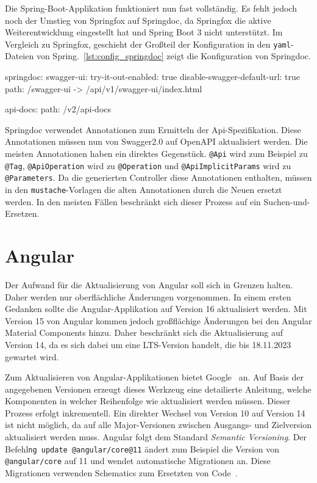 Die Spring-Boot-Applikation funktioniert nun fast vollständig. Es fehlt jedoch noch der Umstieg von Springfox auf Springdoc, da Springfox die aktive Weiterentwicklung eingestellt hat und Spring Boot 3 nicht unterstützt. Im Vergleich zu Springfox, geschieht der Großteil der Konfiguration in den \texttt{yaml}-Dateien von Spring.~\autoref{lst:config_springdoc} zeigt die Konfiguration von Springdoc.

\begin{JavaCode}[numbers=none, caption={Konfiguration von Springdoc}, label={lst:config_springdoc}]
  springdoc:
    swagger-ui:
      try-it-out-enabled: true
      disable-swagger-default-url: true
      path: /swagger-ui -> /api/v1/swagger-ui/index.html

    api-docs:
      path: /v2/api-docs
\end{JavaCode}

Springdoc verwendet Annotationen zum Ermitteln der Api-Spezifikation. Diese Annotationen müssen nun von Swagger2.0 auf OpenAPI aktualisiert werden. Die meisten Annotationen haben ein direktes Gegenstück. \texttt{@Api} wird zum Beispiel zu \texttt{@Tag}, \texttt{@ApiOperation} wird zu \texttt{@Operation} und \texttt{@ApiImplicitParams} wird zu \texttt{@Parameters}. Da die generierten Controller diese Annotationen enthalten, müssen in den \texttt{mustache}-Vorlagen die alten Annotationen durch die Neuen ersetzt werden. In den meisten Fällen beschränkt sich dieser Prozess auf ein Suchen-und-Ersetzen.

\section{Angular}

Der Aufwand für die Aktualisierung von Angular soll sich in Grenzen halten. Daher werden nur oberflächliche Änderungen vorgenommen. In einem ersten Gedanken sollte die Angular-Applikation auf Version 16 aktualisiert werden. Mit Version 15 von Angular kommen jedoch großflächige Änderungen bei den Angular Material Components hinzu. Daher beschränkt sich die Aktualisierung auf Version 14, da es sich dabei um eine LTS-Version handelt, die bis 18.11.2023 gewartet wird.

Zum Aktualisieren von Angular-Applikationen bietet Google~\textcite{angularupgradeguide} an. Auf Basis der angegebenen Versionen erzeugt dieses Werkzeug eine detailierte Anleitung, welche Komponenten in welcher Reihenfolge wie aktualisiert werden müssen. Dieser Prozess erfolgt inkrementell. Ein direkter Wechsel von Version 10 auf Version 14 ist nicht möglich, da auf alle Major-Versionen zwischen Ausgangs- und Zielversion aktualisiert werden muss. Angular folgt dem Standard \textit{Semantic Versioning}. Der Befehl\texttt{ng update @angular/core@11} ändert zum Beispiel die Version von \texttt{@angular/core} auf 11 und wendet automatische Migrationen an. Diese Migrationen verwenden Schematics zum Ersetzten von Code~\parencite{angularschematics}.

